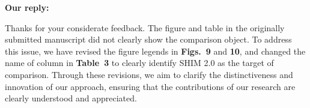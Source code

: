 \documentclass{article}
\begin{document}
    
\begin{flushleft}
  \textbf{Our reply:}
\end{flushleft}

\begin{adjustwidth}{1cm}{1cm}  %
Thanks for your considerate feedback. The figure and table in the originally submitted manuscript did not clearly show the comparison object. To address this issue, we have revised the figure legends in \textbf{Figs.~9} and \textbf{10}, and changed the name of column in \textbf{Table~3} to clearly identify SHIM 2.0 as the target of comparison.
Through these revisions, we aim to clarify the distinctiveness and innovation of our approach, ensuring that the contributions of our research are clearly understood and appreciated. 
\end{adjustwidth}
\bigskip


\\
\end{document}
